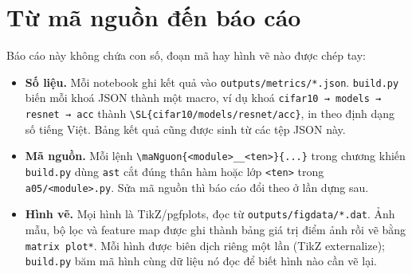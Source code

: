 \section{Từ mã nguồn đến báo cáo}

Báo cáo này không chứa con số, đoạn mã hay hình vẽ nào được chép tay:

\begin{itemize}
  \item \textbf{Số liệu.} Mỗi notebook ghi kết quả vào \texttt{outputs/metrics/*.json}. \texttt{build.py} biến mỗi khoá
        JSON thành một macro, ví dụ khoá \texttt{cifar10 → models → resnet → acc} thành \verb|\SL{cifar10/models/resnet/acc}|,
        in theo định dạng số tiếng Việt. Bảng kết quả cũng được sinh từ các tệp JSON này.
  \item \textbf{Mã nguồn.} Mỗi lệnh \verb|\maNguon{<module>__<ten>}{...}| trong chương khiến \texttt{build.py} dùng
        \texttt{ast} cắt đúng thân hàm hoặc lớp \texttt{<ten>} trong \texttt{a05/<module>.py}. Sửa mã nguồn thì báo cáo
        đổi theo ở lần dựng sau.
  \item \textbf{Hình vẽ.} Mọi hình là TikZ/pgfplots, đọc từ \texttt{outputs/figdata/*.dat}. Ảnh mẫu, bộ lọc và
        feature map được ghi thành bảng giá trị điểm ảnh rồi vẽ bằng \texttt{matrix plot*}. Mỗi hình được biên dịch
        riêng một lần (TikZ externalize); \texttt{build.py} băm mã hình cùng dữ liệu nó đọc để biết hình nào cần vẽ lại.
\end{itemize}
